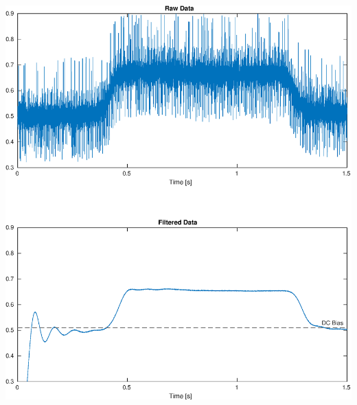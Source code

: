 \documentclass{article}
\begin{document}
\includegraphics[width=\textwidth]{07-under-pressure.d/data.eps}
\end{document}

